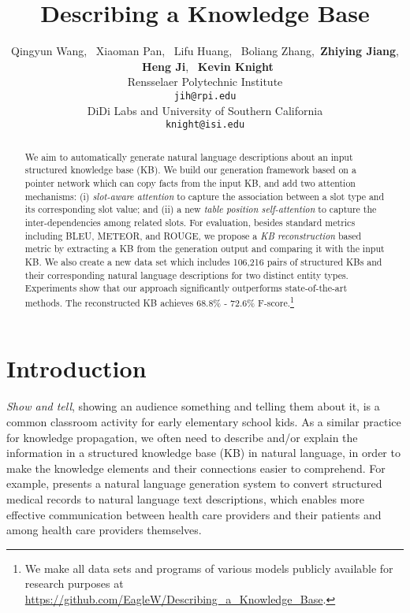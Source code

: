 \documentclass[11pt,a4paper]{article}
\title{Describing a Knowledge Base}
\author{
Qingyun Wang, \ Xiaoman Pan, \ Lifu Huang, \ Boliang Zhang,\ \textbf{Zhiying Jiang}, \\ \ \textbf{Heng Ji}, \ \textbf{Kevin Knight} \\
 Rensselaer Polytechnic Institute \\
{\tt jih@rpi.edu} \\
 DiDi Labs and University of Southern California \\
{\tt knight@isi.edu}
}
\date{}
\begin{document}
\maketitle



\begin{abstract}








We aim to automatically generate natural language descriptions about an input structured knowledge base (KB). We build our generation framework based on a pointer network which can copy facts from the input KB, and add two attention mechanisms: (i) \emph{slot-aware attention} to capture the association between a slot type and its corresponding slot value; and (ii) a new \emph{table position self-attention} to capture the inter-dependencies among related slots. For evaluation, besides standard metrics including BLEU, METEOR, and ROUGE, we propose a \textit{KB reconstruction} based metric by extracting a KB from the generation output and comparing it with the input KB. We also create a new data set which includes 106,216 pairs of structured KBs and their corresponding natural language descriptions for two distinct entity types.
Experiments show that our approach significantly outperforms state-of-the-art methods. The reconstructed KB achieves 68.8\% - 72.6\% F-score.\footnote{We make all data sets and programs of various models publicly available for research purposes at \url{https://github.com/EagleW/Describing_a_Knowledge_Base}.} 





\end{abstract}



 \section{Introduction}
\label{secintro}


\emph{Show and tell}, showing an audience something and telling them about it, is a common classroom activity for early elementary school kids. As a similar practice for knowledge propagation, we often need to describe and/or explain the information in a structured knowledge base (KB) 
in natural language, in order to make the knowledge elements and their connections easier to comprehend. For example, \cite{cawsey1997natural} presents a natural language generation system to convert structured medical records to natural language text descriptions, which enables more effective communication between health care providers and their patients and among health care providers themselves.
\end{document}
